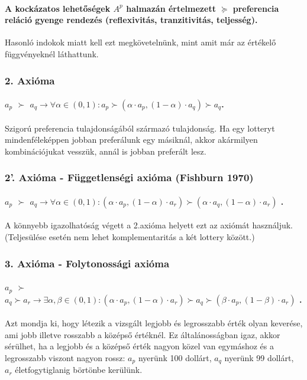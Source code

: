 \documentclass[a4paper,12pt]{article}
\begin{document}
\paragraph{A kockázatos lehetőségek $A^p$ halmazán értelmezett $\succeq$ preferencia reláció gyenge rendezés (reflexivitás, tranzitivitás, teljesség).}

Hasonló indokok miatt kell ezt megkövetelnünk, mint amit már az értékelő függvényeknél láthattunk.

\subsubsection{2. Axióma}
\paragraph{$a_p$  $\succ$ $a_q \rightarrow \forall \alpha \in (0,1): a_p \succ (\alpha\cdot a_p , (1-\alpha)\cdot a_q ) \succ a_q$.} 
Szigorú preferencia tulajdonságából származó tulajdonság. Ha egy lotteryt mindenféleképpen jobban preferálunk egy másiknál, akkor akármilyen kombinációjukat vesszük, annál is jobban preferált lesz.

\subsubsection{2'. Axióma - Függetlenségi axióma (Fishburn 1970)}
\paragraph{$a_p$  $\succ$ $a_q \rightarrow \forall \alpha \in (0,1): (\alpha\cdot a_p , (1-\alpha)\cdot a_r ) \succ (\alpha\cdot a_q , (1-\alpha)\cdot a_r )$ .} A könnyebb igazolhatóság végett a 2.axióma helyett ezt az axiómát használjuk. (Teljesülése esetén nem lehet komplementaritás a két lottery között.)

\subsubsection{3. Axióma - Folytonossági axióma}
\paragraph{$a_p$  $\succ$ $a_q \succ a_r \rightarrow \exists \alpha,\beta \in (0,1): (\alpha\cdot a_p , (1-\alpha)\cdot a_r )  \succ a_q \succ (\beta\cdot a_p , (1-\beta)\cdot a_r ) $ .} Azt mondja ki, hogy létezik a vizsgált legjobb és legrosszabb érték olyan keverése, ami jobb illetve rosszabb a középső értéknél. Ez általánosságban igaz, akkor sérülhet, ha a legjobb és a középső érték nagyon közel van egymáshoz és a legrosszabb viszont nagyon rossz: $a_p$ nyerünk 100 dollárt, $a_q$ nyerünk 99 dollárt, $a_r$ életfogytiglanig börtönbe kerülünk.
\end{document}
